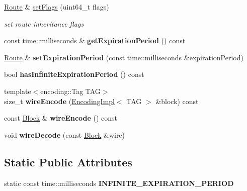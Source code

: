 \begin{DoxyCompactItemize}
\item 
\hyperlink{classndn_1_1nfd_1_1Route}{Route} \& \hyperlink{classndn_1_1nfd_1_1Route_a01142381dc8d307f9bf9e61dcf643afc}{set\+Flags} (uint64\+\_\+t flags)
\begin{DoxyCompactList}\small\item\em set route inheritance flags \end{DoxyCompactList}\item 
const time\+::milliseconds \& {\bfseries get\+Expiration\+Period} () const\hypertarget{classndn_1_1nfd_1_1Route_a688bbda1196c9d7a15ed7eb221c18a52}{}\label{classndn_1_1nfd_1_1Route_a688bbda1196c9d7a15ed7eb221c18a52}

\item 
\hyperlink{classndn_1_1nfd_1_1Route}{Route} \& {\bfseries set\+Expiration\+Period} (const time\+::milliseconds \&expiration\+Period)\hypertarget{classndn_1_1nfd_1_1Route_a3b2862b56e5896e8a3eb6aab7318cf74}{}\label{classndn_1_1nfd_1_1Route_a3b2862b56e5896e8a3eb6aab7318cf74}

\item 
bool {\bfseries has\+Infinite\+Expiration\+Period} () const\hypertarget{classndn_1_1nfd_1_1Route_afb3a751a88acd5036206874b649a3b5d}{}\label{classndn_1_1nfd_1_1Route_afb3a751a88acd5036206874b649a3b5d}

\item 
{\footnotesize template$<$encoding\+::\+Tag T\+AG$>$ }\\size\+\_\+t {\bfseries wire\+Encode} (\hyperlink{classndn_1_1encoding_1_1EncodingImpl}{Encoding\+Impl}$<$ T\+AG $>$ \&block) const\hypertarget{classndn_1_1nfd_1_1Route_a23c1a4162fd4ff4de11f583fbe14137d}{}\label{classndn_1_1nfd_1_1Route_a23c1a4162fd4ff4de11f583fbe14137d}

\item 
const \hyperlink{classndn_1_1Block}{Block} \& {\bfseries wire\+Encode} () const\hypertarget{classndn_1_1nfd_1_1Route_a98f2f09e33842c54b4c5f5b72b19af36}{}\label{classndn_1_1nfd_1_1Route_a98f2f09e33842c54b4c5f5b72b19af36}

\item 
void {\bfseries wire\+Decode} (const \hyperlink{classndn_1_1Block}{Block} \&wire)\hypertarget{classndn_1_1nfd_1_1Route_a6a69cdc47967bf0a76bd77d17b07c328}{}\label{classndn_1_1nfd_1_1Route_a6a69cdc47967bf0a76bd77d17b07c328}

\end{DoxyCompactItemize}
\subsection*{Static Public Attributes}
\begin{DoxyCompactItemize}
\item 
static const time\+::milliseconds {\bfseries I\+N\+F\+I\+N\+I\+T\+E\+\_\+\+E\+X\+P\+I\+R\+A\+T\+I\+O\+N\+\_\+\+P\+E\+R\+I\+OD}\hypertarget{classndn_1_1nfd_1_1Route_abeeba9e9d832a1691bf4957a3038c624}{}\label{classndn_1_1nfd_1_1Route_abeeba9e9d832a1691bf4957a3038c624}

\end{DoxyCompactItemize}


